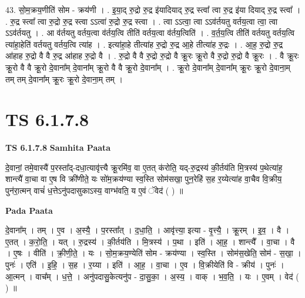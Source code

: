 \documentclass[17pt]{extarticle}
\begin{document}
43. सो॒म॒क्रय॒णीति॑ सोम - क्रय॑णी । . इ॒या॒द् रु॒द्रो रु॒द्र इ॑यादियाद् रु॒द्र स्त्वा᳚ त्वा रु॒द्र इ॑या दियाद् रु॒द्र स्त्वा᳚ । . रु॒द्र स्त्वा᳚ त्वा रु॒द्रो रु॒द्र स्त्वा ऽऽत्वा॑ रु॒द्रो रु॒द्र स्त्वा । . त्वा ऽऽत्वा॒ त्वा ऽऽव॑र्तयतु वर्तय॒त्वा त्वा॒ त्वा ऽऽव॑र्तयतु । . आ व॑र्तयतु वर्तय॒त्वा व॑र्तय॒त्वि तीति॑ वर्तय॒त्वा व॑र्तय॒त्विति॑ । . व॒र्त॒य॒त्वि तीति॑ वर्तयतु वर्तय॒त्वि त्या॑हा॒हेति॑ वर्तयतु वर्तय॒त्वि त्या॑ह । . इत्या॑हा॒हे तीत्या॑ह रु॒द्रो रु॒द्र आ॒हे तीत्या॑ह रु॒द्रः । . आ॒ह॒ रु॒द्रो रु॒द्र आ॑हाह रु॒द्रो वै वै रु॒द्र आ॑हाह रु॒द्रो वै । . रु॒द्रो वै वै रु॒द्रो रु॒द्रो वै क्रू॒रः क्रू॒रो वै रु॒द्रो रु॒द्रो वै क्रू॒रः । . वै क्रू॒रः क्रू॒रो वै वै क्रू॒रो दे॒वाना᳚म् दे॒वाना᳚म् क्रू॒रो वै वै क्रू॒रो दे॒वाना᳚म् । . क्रू॒रो दे॒वाना᳚म् दे॒वाना᳚म् क्रू॒रः क्रू॒रो दे॒वाना॒म् तम् तम् दे॒वाना᳚म् क्रू॒रः क्रू॒रो दे॒वाना॒म् तम् । \newline
\pagebreak
{}

\section{ TS 6.1.7.8 }

\textbf{TS 6.1.7.8 } \newline
\textbf{Samhita Paata} \newline

दे॒वानां॒ तमे॒वास्यै॑ प॒रस्ता᳚द्-दधा॒त्यावृ॑त्त्यै क्रू॒रमि॑व॒ वा ए॒तत् क॑रोति॒ यद्-रु॒द्रस्य॑ की॒र्तय॑ति मि॒त्रस्य॑ प॒थेत्या॑ह॒ शान्त्यै॑ वा॒चा वा ए॒ष वि क्री॑णीते॒ यः सो॑म॒क्रय॑ण्या स्व॒स्ति सोम॑सखा॒ पुन॒रेहि॑ स॒ह र॒य्येत्या॑ह वा॒चैव वि॒क्रीय॒ पुन॑रा॒त्मन् वाचं॑ ध॒त्तेऽनु॑पदासुकाऽस्य॒ वाग्भ॑वति॒ य ए॒वं ॅवेद॑ ( ) ॥ \newline

\textbf{Pada Paata} \newline

दे॒वाना᳚म् । तम् । ए॒व । अ॒स्यै॒ । प॒रस्ता᳚त् । द॒धा॒ति॒ । आवृ॑त्त्या॒ इत्या - वृ॒त्त्यै॒ । क्रू॒रम् । इ॒व॒ । वै । ए॒तत् । क॒रो॒ति॒ । यत् । रु॒द्रस्य॑ । की॒र्तय॑ति । मि॒त्रस्य॑ । प॒था । इति॑ । आ॒ह॒ । शान्त्यै᳚ । वा॒चा । वै । ए॒षः । वीति॑ । क्री॒णी॒ते॒ । यः । सो॒म॒क्रय॒ण्येति॑ सोम - क्रय॑ण्या । स्व॒स्ति । सोम॑स॒खेति॒ सोम॑ - स॒खा॒ । पुनः॑ । एति॑ । इ॒हि॒ । स॒ह । र॒य्या । इति॑ । आ॒ह॒ । वा॒चा । ए॒व । वि॒क्रीयेति॑ वि - क्रीय॑ । पुनः॑ । आ॒त्मन् । वाच᳚म् । ध॒त्ते॒ । अनु॑पदासु॒केत्यनु॑प - दा॒सु॒का॒ । अ॒स्य॒ । वाक् । भ॒व॒ति॒ । यः । ए॒वम् । वेद॑ ( ) ॥  \newline
\end{document}
